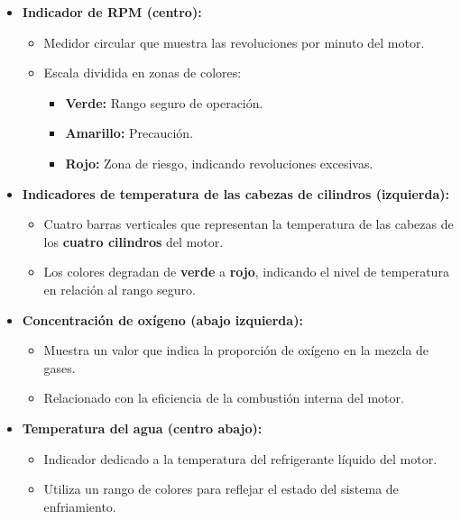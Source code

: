 \begin{itemize}
    \item \textbf{Indicador de RPM (centro):}
    \begin{itemize}
        \item Medidor circular que muestra las revoluciones por minuto del motor.
        \item Escala dividida en zonas de colores:
        \begin{itemize}
            \item \textbf{Verde:} Rango seguro de operación.
            \item \textbf{Amarillo:} Precaución.
            \item \textbf{Rojo:} Zona de riesgo, indicando revoluciones excesivas.
        \end{itemize}
    \end{itemize}

    \item \textbf{Indicadores de temperatura de las cabezas de cilindros (izquierda):}
    \begin{itemize}
        \item Cuatro barras verticales que representan la temperatura de las cabezas de los \textbf{cuatro cilindros} del motor.
        \item Los colores degradan de \textbf{verde} a \textbf{rojo}, indicando el nivel de temperatura en relación al rango seguro.
    \end{itemize}

    \item \textbf{Concentración de oxígeno (abajo izquierda):}
    \begin{itemize}
        \item Muestra un valor que indica la proporción de oxígeno en la mezcla de gases.
        \item Relacionado con la eficiencia de la combustión interna del motor.
    \end{itemize}

    \item \textbf{Temperatura del agua (centro abajo):}
    \begin{itemize}
        \item Indicador dedicado a la temperatura del refrigerante líquido del motor.
        \item Utiliza un rango de colores para reflejar el estado del sistema de enfriamiento.
    \end{itemize}


\end{itemize}
